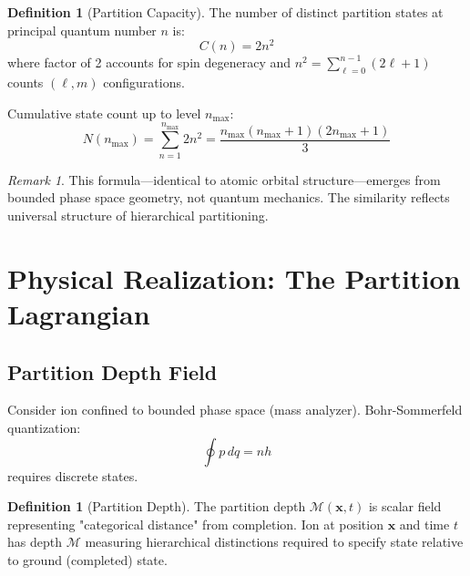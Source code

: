 \documentclass[twocolumn,10pt]{revtex4-2}
\theoremstyle{definition}
\newtheorem{definition}[theorem]{Definition}
\theoremstyle{remark}
\newtheorem{remark}[theorem]{Remark}
\newcommand{\Mdepth}{\mathcal{M}}
\begin{document}
\begin{definition}[Partition Capacity]
\label{def:capacity}
The number of distinct partition states at principal quantum number $n$ is:
\begin{equation}
C(n) = 2n^2
\label{eq:capacity_formula}
\end{equation}
where factor of 2 accounts for spin degeneracy and $n^2 = \sum_{\ell=0}^{n-1}(2\ell + 1)$ counts $(\ell, m)$ configurations.
\end{definition}

\noindent Cumulative state count up to level $n_{\max}$:
\begin{equation}
N(n_{\max}) = \sum_{n=1}^{n_{\max}} 2n^2 = \frac{n_{\max}(n_{\max}+1)(2n_{\max}+1)}{3}
\label{eq:cumulative_capacity}
\end{equation}

\begin{remark}
This formula—identical to atomic orbital structure—emerges from bounded phase space geometry, not quantum mechanics. The similarity reflects universal structure of hierarchical partitioning.
\end{remark}

\section{Physical Realization: The Partition Lagrangian}
\label{sec:mass_spec_lagrangian}

\subsection{Partition Depth Field}

Consider ion confined to bounded phase space (mass analyzer). Bohr-Sommerfeld quantization:
\begin{equation}
\oint p \, dq = n h
\label{eq:bohr_sommerfeld}
\end{equation}
requires discrete states.

\begin{definition}[Partition Depth]
\label{def:partition_depth_field}
The partition depth $\Mdepth(\mathbf{x}, t)$ is scalar field representing "categorical distance" from completion. Ion at position $\mathbf{x}$ and time $t$ has depth $\Mdepth$ measuring hierarchical distinctions required to specify state relative to ground (completed) state.
\end{definition}
\end{document}
